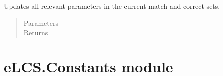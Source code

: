 \documentclass[letterpaper,10pt,english]{sphinxmanual}
\begin{document}
\begin{fulllineitems}
\begin{fulllineitems}
\end{fulllineitems}


\begin{fulllineitems}
\label{\detokenize{eLCS:eLCS.ClassifierSet.ClassifierSet.updateSets}}
Updates all relevant parameters in the current match and correct sets.
\begin{quote}\begin{description}
\item[{Parameters}] \leavevmode
{} \textendash{} 

\item[{Returns}] \leavevmode


\end{description}\end{quote}

\end{fulllineitems}


\end{fulllineitems}



\section{eLCS.Constants module}
\label{\detokenize{eLCS:elcs-constants-module}}\label{\detokenize{eLCS:module-eLCS.Constants}}
\end{document}
